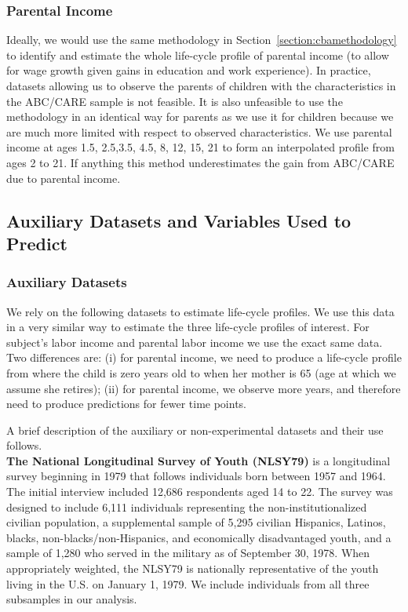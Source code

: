 \subsubsection{Parental Income}

\noindent Ideally, we would use the same methodology in Section~\ref{section:cbamethodology} to identify and estimate the whole life-cycle profile of parental income (to allow for wage growth given gains in education and work experience). In practice, datasets allowing us to observe the parents of children with the characteristics in the ABC/CARE sample is not feasible. It is also unfeasible to use the methodology in an identical way for parents as we use it for children because we are much more limited with respect to observed characteristics. We use parental income at ages 1.5, 2.5,3.5, 4.5, 8, 12, 15, 21 to form an interpolated profile from ages 2 to 21. If anything this method underestimates the gain from ABC/CARE due to parental income.

\subsection{Auxiliary Datasets and Variables Used to Predict}

\subsubsection{Auxiliary Datasets}

\noindent We rely on the following datasets to estimate life-cycle profiles. We use this data in a very similar way to estimate the three life-cycle profiles of interest. For subject's labor income and parental labor income we use the exact same data. Two differences are: (i) for parental income, we need to produce a life-cycle profile from where the child is zero years old to when her mother is 65 (age at which we assume she retires); (ii) for parental income, we observe more years, and therefore need to produce predictions for fewer time points.

\noindent A brief description of the auxiliary or non-experimental datasets and their use follows.\\

\noindent \textbf{The National Longitudinal Survey of Youth (NLSY79)} is a longitudinal survey beginning in 1979 that follows individuals born between 1957 and 1964. The initial interview included 12,686 respondents aged 14 to 22. The survey was designed to include 6,111 individuals representing the non-institutionalized civilian population, a supplemental sample of 5,295 civilian Hispanics, Latinos, blacks, non-blacks/non-Hispanics, and economically disadvantaged youth, and a sample of 1,280 who served in the military as of September 30, 1978. When appropriately weighted, the NLSY79 is nationally representative of the youth living in the U.S. on January 1, 1979. We include individuals from all three subsamples in our analysis. \\

